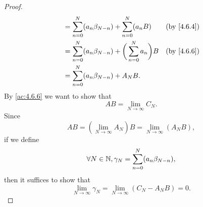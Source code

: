 \begin{proof}
\begin{align*}
                          & = \sum_{n = 0}^N (a_n \beta_{N - n}) + \sum_{n = 0}^N (a_n B)           &  & \by{4.6.4} \\
                          & = \sum_{n = 0}^N (a_n \beta_{N - n}) + \bigg(\sum_{n = 0}^N a_n\bigg) B &  & \by{4.6.6} \\
                          & = \sum_{n = 0}^N (a_n \beta_{N - n}) + A_N B.
  \end{align*}
  By \cref{ac:4.6.6} we want to show that
  \[
    AB = \lim_{N \to \infty} C_N.
  \]
  Since
  \[
    AB = (\lim_{N \to \infty} A_N) B = \lim_{N \to \infty} (A_N B),
  \]
  if we define
  \[
    \forall N \in \mathbb{N}, \gamma_N = \sum_{n = 0}^N (a_n \beta_{N - n}),
  \]
  then it suffices to show that
  \[
    \lim_{N \to \infty} \gamma_N = \lim_{N \to \infty} (C_N - A_N B) = 0.
  \]


\end{proof}
